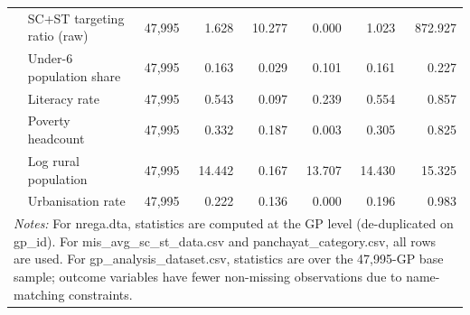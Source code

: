 \begin{table}[htbp]
\begin{tabular}{llrrrrrr}
 & SC+ST targeting ratio (raw) & 47,995 & 1.628 & 10.277 & 0.000 & 1.023 & 872.927 \\
 & Under-6 population share & 47,995 & 0.163 & 0.029 & 0.101 & 0.161 & 0.227 \\
 & Literacy rate & 47,995 & 0.543 & 0.097 & 0.239 & 0.554 & 0.857 \\
 & Poverty headcount & 47,995 & 0.332 & 0.187 & 0.003 & 0.305 & 0.825 \\
 & Log rural population & 47,995 & 14.442 & 0.167 & 13.707 & 14.430 & 15.325 \\
 & Urbanisation rate & 47,995 & 0.222 & 0.136 & 0.000 & 0.196 & 0.983 \\
\hline\hline
\multicolumn{8}{p{14cm}}{\footnotesize \textit{Notes:} For nrega.dta, statistics are computed at the GP level (de-duplicated on gp\_id). For mis\_avg\_sc\_st\_data.csv and panchayat\_category.csv, all rows are used. For gp\_analysis\_dataset.csv, statistics are over the 47{,}995-GP base sample; outcome variables have fewer non-missing observations due to name-matching constraints.}
\end{tabular}
\end{table}